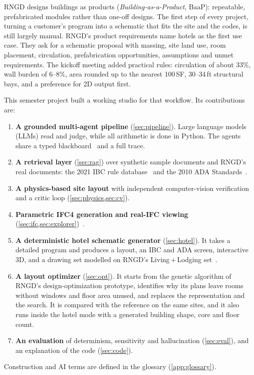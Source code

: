 \documentclass[10pt,a4paper]{article}
\theoremstyle{definition}
\begin{document}
RNGD designs buildings as products (\emph{Building-as-a-Product}, BaaP): repeatable, prefabricated modules rather than
one-off designs. The first step of every project, turning a customer's program into a schematic that fits the site
and the codes, is still largely manual. RNGD's product requirements name hotels as the first use case. They ask for a
schematic proposal with massing, site land use, room placement, circulation, prefabrication opportunities, assumptions
and unmet requirements. The kickoff meeting added practical rules: circulation of about 33\%, wall burden of 6--8\%,
area rounded up to the nearest 100\,SF, 30--34\,ft structural bays, and a preference for 2D output first.

This semester project built a working studio for that workflow. Its contributions are:
\begin{enumerate}
\item \textbf{A grounded multi-agent pipeline} (\cref{sec:pipeline}). Large language models (LLMs) read and judge,
while all arithmetic is done in Python. The agents share a typed blackboard~\citep{nii1986blackboard} and a full trace.
\item \textbf{A retrieval layer} (\cref{sec:rag}) over synthetic sample documents and RNGD's real documents: the 2021
IBC rule database~\citep{rngd2026ibc,icc2021ibc} and the 2010 ADA Standards~\citep{doj2010ada}.
\item \textbf{A physics-based site layout} with independent computer-vision verification and a critic loop
(\cref{sec:physics,sec:cv}).
\item \textbf{Parametric IFC4 generation and real-IFC viewing} (\cref{sec:ifc,sec:explorer})~\citep{iso16739,ifcopenshell}.
\item \textbf{A deterministic hotel schematic generator} (\cref{sec:hotel}). It takes a detailed program and produces
a layout, an IBC and ADA screen, interactive 3D, and a drawing set modelled on RNGD's Living\,+\,Lodging
set~\citep{rngd2025ll}.
\item \textbf{A layout optimizer} (\cref{sec:opt}). It starts from the genetic algorithm of RNGD's
design-optimization prototype, identifies why its plans leave rooms without windows and floor area unused, and
replaces the representation and the search. It is compared with the reference on the same sites, and it also runs
inside the hotel mode with a generated building shape, core and floor count.
\item \textbf{An evaluation} of determinism, sensitivity and hallucination (\cref{sec:eval}), and an explanation of the
code (\cref{sec:code}).
\end{enumerate}
Construction and AI terms are defined in the glossary (\cref{app:glossary}).
\end{document}
